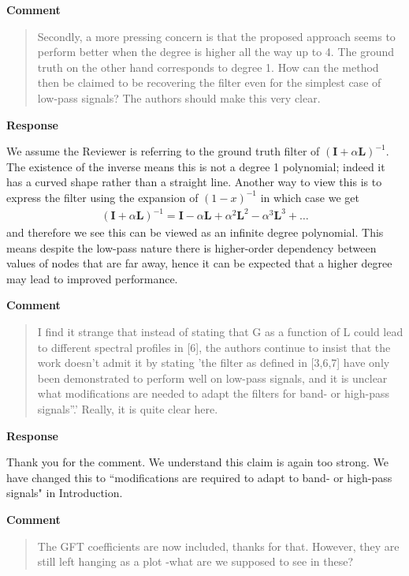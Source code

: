 \documentclass[11pt,onecolumn,journal]{IEEEtran}
\begin{document}
\textbf{Comment}

\begin{quote}
    Secondly, a more pressing concern is that the proposed approach seems to perform better when the degree is higher all the way up to 4. The ground truth on the other hand corresponds to degree 1. How can the method then be claimed to be recovering the filter even for the simplest case of low-pass signals? The authors should make this very clear.
\end{quote}

\textbf{Response}

We assume the Reviewer is referring to the ground truth filter of $(\mathbf{I} + \alpha\mathbf{L})^{-1}$. The existence of the inverse means this is not a degree 1 polynomial; %
indeed it has a curved shape rather than a straight line. Another way to view this is to express the filter using the expansion of $(1 - x)^{-1}$ in which case we get
\begin{align}
    (\mathbf{I} + \alpha\mathbf{L})^{-1} = \mathbf{I} - \alpha \mathbf{L} + \alpha^2\mathbf{L}^2 - \alpha^3\mathbf{L}^3 + \dots
\end{align}
and therefore we see this can be viewed as an infinite degree polynomial. This means despite the low-pass nature there is higher-order dependency between values of nodes that are far away, hence it can be expected that a higher degree may lead to improved performance.

\textbf{Comment}
\begin{quote}
    I find it strange that instead of stating that G as a function of L could lead to different spectral profiles in [6], the authors continue to insist that the work doesn't admit it by stating 'the filter as defined in [3,6,7] have only been demonstrated to perform well on low-pass signals, and it is unclear what modifications are needed to adapt the filters for band- or high-pass signals”.' Really, it is quite clear here.
\end{quote}

\textbf{Response}

Thank you for the comment. We understand this claim is again too strong. We have changed this to ``modifications are required to adapt to band- or high-pass signals" in Introduction.

\textbf{Comment}
\begin{quote}
    The GFT coefficients are now included, thanks for that. However, they are still left hanging as a plot -what are we supposed to see in these?
\end{quote}
\end{document}
